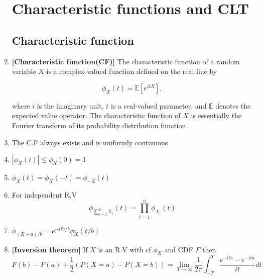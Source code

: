 \documentclass[12pt,oneside]{book}
\begin{document}
\begin{enumerate}
\chapter{Characteristic functions and CLT}
\section{Characteristic function}
\item \textbf{[Characteristic function(CF)]} The characteristic function of a random variable $X$ is a complex-valued function defined on the real line by

\begin{equation*}
\phi_X(t) = \mathbb{E}[e^{itX}],
\end{equation*}

where $i$ is the imaginary unit, $t$ is a real-valued parameter, and $\mathbb{E}$ denotes the expected value operator. The characteristic function of $X$ is essentially the Fourier transform of its probability distribution function. 
\item The C.F always exists and is uniformly continuous
\item $|\phi_X(t)|\leq\phi_X(0)=1$
\item $\overline{\phi_X(t)}=\phi_X(-t)=\phi_{-X}(t)$
\item For independent R.V $$\phi_{\sum_{i=1}^n X_i}(t)=\prod_{i=1}^n\phi_{X_i}(t)$$
\item $\phi_{(X-a)/b}=e^{-ita/b}\phi_X(t/b)$
\item \textbf{[Inversion theorem]} If $X$ is an R.V with cf $\phi_X$ and CDF $F$ then 
$$F(b)-F(a)+\frac{1}{2}\left(P(X=a)-P(X=b)\right)=\lim_{T\to\infty}\frac{1}{2\pi}\int_{-T}^T\frac{e^{-itb}-e^{-ita}}{it}dt$$


\end{enumerate}
\end{document}
